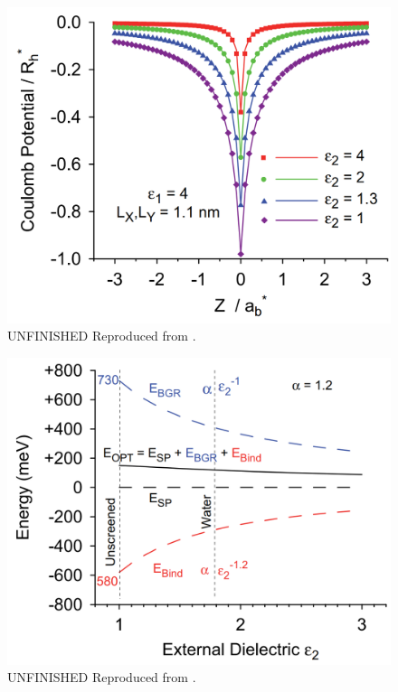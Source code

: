 \begin{figure}
	\centering
	\includegraphics[scale=0.23]{images/chapter_optical_props/coulomb_potl_walsh}
	\caption{ {\color{red} UNFINISHED} Reproduced from \cite{walsh2008scaling}.}
\end{figure}

\begin{figure}
	\centering
	\includegraphics[scale=0.25]{images/chapter_optical_props/dielectric_binding_walsh_2007}
	\caption{ {\color{red} UNFINISHED} Reproduced from \cite{walsh2008scaling}.}
\end{figure}

